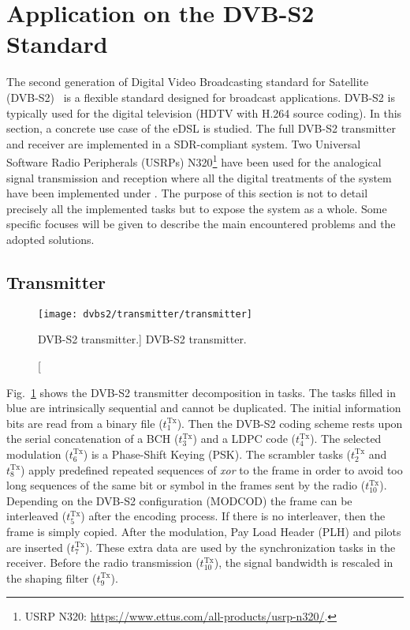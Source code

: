 \section{Application on the DVB-S2 Standard}

The second generation of Digital Video Broadcasting standard for Satellite
(DVB-S2)~\cite{ETSI2005} is a flexible standard designed for broadcast
applications. DVB-S2 is typically used for the digital television (HDTV with
H.264 source coding). In this section, a concrete use case of the \AFFECT eDSL
is studied. The full DVB-S2 transmitter and receiver are implemented in a
SDR-compliant system. Two Universal Software Radio Peripherals (USRPs)
N320\footnote{USRP N320: \url{https://www.ettus.com/all-products/usrp-n320/}.}
have been used for the analogical signal transmission and reception where all
the digital treatments of the system have been implemented under \AFFECT. The
purpose of this section is not to detail precisely all the implemented tasks
but to expose the system as a whole. Some specific focuses will be given to
describe the main encountered problems and the adopted solutions.

\subsection{Transmitter}

\begin{figure}[htp]
  \centering
  \texttt{[image: dvbs2/transmitter/transmitter]}
  \caption
    [DVB-S2 transmitter.]
    {DVB-S2 transmitter.}
  \label{fig:dvbs2_transmitter}
\end{figure}

Fig.~\ref{fig:dvbs2_transmitter} shows the DVB-S2 transmitter decomposition in
tasks. The tasks filled in blue are intrinsically sequential and cannot be
duplicated. The initial information bits are read from a binary file
($t^\text{Tx}_1$). Then the DVB-S2 coding scheme rests upon the serial
concatenation of a BCH ($t^\text{Tx}_3$) and a LDPC code ($t^\text{Tx}_4$). The
selected modulation ($t^\text{Tx}_6$) is a Phase-Shift Keying (PSK). The
scrambler tasks ($t^\text{Tx}_2$ and $t^\text{Tx}_8$) apply predefined repeated
sequences of \emph{xor} to the frame in order to avoid too long sequences of the
same bit or symbol in the frames sent by the radio ($t^\text{Tx}_{10}$).
Depending on the DVB-S2 configuration (MODCOD) the frame can be interleaved
($t^\text{Tx}_5$) after the encoding process. If there is no interleaver, then
the frame is simply copied. After the modulation, Pay Load Header (PLH) and
pilots are inserted ($t^\text{Tx}_7$). These extra data are used by the
synchronization tasks in the receiver. Before the radio transmission
($t^\text{Tx}_{10}$), the signal bandwidth is rescaled in the shaping filter
($t^\text{Tx}_9$).

